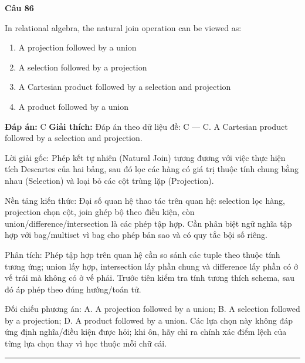 \documentclass[11pt,a4paper]{article}
\newenvironment{question}[1]{%
  \par\vspace{1em}\noindent\textbf{\large Câu #1}\par\vspace{0.4em}
}{%
  \par\vspace{1em}\hrule\vspace{0.6em}
}
\newenvironment{choices}{%
  \begin{enumerate}[label=\textbf{\Alph*.},leftmargin=2.2em,itemsep=2pt,topsep=3pt]
}{%
  \end{enumerate}
}
\newcommand{\choice}{\item}
\begin{document}
\begin{question}{86}
In relational algebra, the natural join operation can be viewed as:
\begin{choices}
\choice A projection followed by a union
\choice A selection followed by a projection
\choice A Cartesian product followed by a selection and projection
\choice A product followed by a union
\end{choices}
\textbf{Đáp án:} C
\textbf{Giải thích:} Đáp án theo dữ liệu đề: C — C. A Cartesian product followed by a selection and projection.

Lời giải gốc: Phép kết tự nhiên (Natural Join) tương đương với việc thực hiện tích Descartes của hai bảng, sau đó lọc các hàng có giá trị thuộc tính chung bằng nhau (Selection) và loại bỏ các cột trùng lặp (Projection).

Nền tảng kiến thức: Đại số quan hệ thao tác trên quan hệ: selection lọc hàng, projection chọn cột, join ghép bộ theo điều kiện, còn union/difference/intersection là các phép tập hợp. Cần phân biệt ngữ nghĩa tập hợp với bag/multiset vì bag cho phép bản sao và có quy tắc bội số riêng.

Phân tích: Phép tập hợp trên quan hệ cần so sánh các tuple theo thuộc tính tương ứng; union lấy hợp, intersection lấy phần chung và difference lấy phần có ở vế trái mà không có ở vế phải. Trước tiên kiểm tra tính tương thích schema, sau đó áp phép theo đúng hướng/toán tử.

Đối chiếu phương án: A. A projection followed by a union; B. A selection followed by a projection; D. A product followed by a union. Các lựa chọn này không đáp ứng định nghĩa/điều kiện được hỏi; khi ôn, hãy chỉ ra chính xác điểm lệch của từng lựa chọn thay vì học thuộc mỗi chữ cái.
\end{question}
\end{document}
